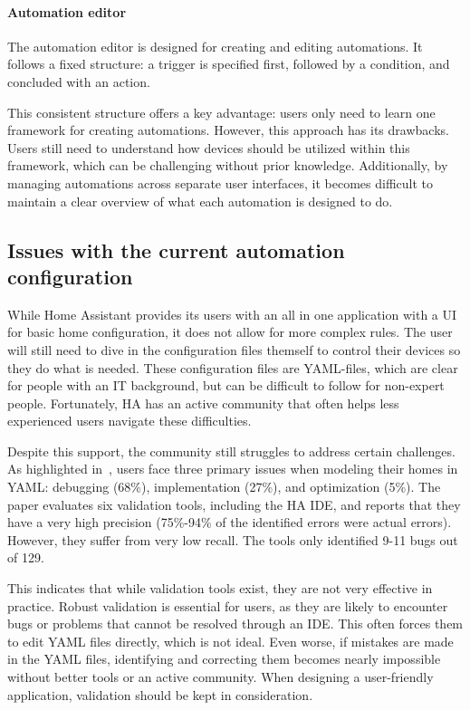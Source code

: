 \documentclass[11pt,a4paper]{report}
\begin{document}
\paragraph{Automation editor}
The automation editor is designed for creating and editing automations. It follows a fixed structure: a trigger is specified first, followed by a condition, and concluded with an action.

This consistent structure offers a key advantage: users only need to learn one framework for creating automations. However, this approach has its drawbacks. Users still need to understand how devices should be utilized within this framework, which can be challenging without prior knowledge. Additionally, by managing automations across separate user interfaces, it becomes difficult to maintain a clear overview of what each automation is designed to do.

\subsection{Issues with the current automation configuration}
\label{home_automation_problems}

While Home Assistant provides its users with an all in one application with a UI for basic home configuration, it does not allow for more complex rules. The user will still need to dive in the configuration files themself to control their devices so they do what is needed. These configuration files are YAML-files, which are clear for people with an IT background, but can be difficult to follow for non-expert people. Fortunately, HA has an active community that often helps less experienced users navigate these difficulties.

Despite this support, the community still struggles to address certain challenges. As highlighted in~\cite{SOTA_AutomationConfigurationSmarthome}, users face three primary issues when modeling their homes in YAML: debugging (68\%), implementation (27\%), and optimization (5\%). The paper evaluates six validation tools, including the HA IDE, and reports that they have a very high precision (75\%-94\% of the identified errors were actual errors). However, they suffer from very low recall. The tools only identified 9-11 bugs out of 129.

This indicates that while validation tools exist, they are not very effective in practice. Robust validation is essential for users, as they are likely to encounter bugs or problems that cannot be resolved through an IDE. This often forces them to edit YAML files directly, which is not ideal. Even worse, if mistakes are made in the YAML files, identifying and correcting them becomes nearly impossible without better tools or an active community. When designing a user-friendly application, validation should be kept in consideration.
\end{document}

